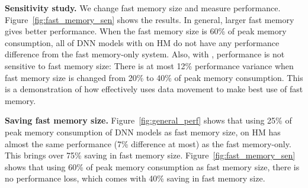 \textbf{Sensitivity study.}
We change fast memory size and measure performance. Figure~\ref{fig:fast_memory_sen} shows the results. In general, larger fast memory gives better performance. When the fast memory size is 60\% of peak memory consumption, all of DNN models with \name on HM do not have any performance difference from the fast memory-only system. Also, with \name, performance is not sensitive to fast memory size: There is at most 12\% performance variance \textcolor{check}{when fast memory size is changed from 20\% to 40\% of peak memory consumption}. This is a demonstration of how \name effectively uses data movement to make best use of fast memory. 






\textbf{Saving fast memory size.} 
\textcolor{check}{Figure~\ref{fig:general_perf} shows that using 25\% of peak memory consumption of DNN models as fast memory size, \name on HM has almost the same performance (7\% difference at most) as the fast memory-only. 
This brings over 75\% saving in fast memory size.} 
Figure~\ref{fig:fast_memory_sen} shows that using 60\% of peak memory consumption as fast memory size, there is no performance loss, which comes with 40\% saving in fast memory size.




